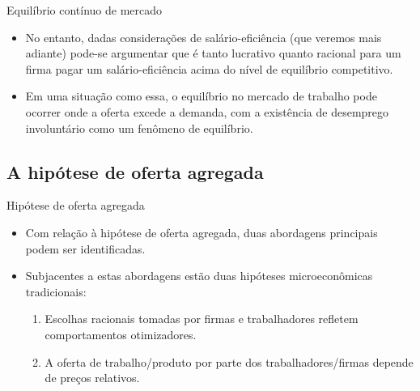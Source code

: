 \documentclass[10pt]{beamer}
\begin{document}
\begin{frame}{Equilíbrio contínuo de mercado}
    \begin{itemize}
        \item No entanto, dadas considerações de salário-eficiência (que veremos mais adiante) pode-se argumentar que é tanto lucrativo quanto racional para um firma pagar um salário-eficiência acima do nível de equilíbrio competitivo.
        \bigskip
        \item Em uma situação como essa, o equilíbrio no mercado de trabalho pode ocorrer onde a oferta excede a demanda, com a existência de desemprego involuntário como um fenômeno de equilíbrio.
    \end{itemize}
\end{frame}

\subsection{A hipótese de oferta agregada}
\begin{frame}{Hipótese de oferta agregada}
    \begin{itemize}
        \item Com relação à hipótese de oferta agregada, duas abordagens principais podem ser identificadas.
        \bigskip
        \item Subjacentes a estas abordagens estão duas hipóteses microeconômicas tradicionais:
        \bigskip
        \begin{enumerate}
            \item Escolhas racionais tomadas por firmas e trabalhadores refletem comportamentos otimizadores.
            \bigskip
            \item A oferta de trabalho/produto por parte dos trabalhadores/firmas depende de preços relativos.
        \end{enumerate}
    \end{itemize}
\end{frame}
\end{document}

